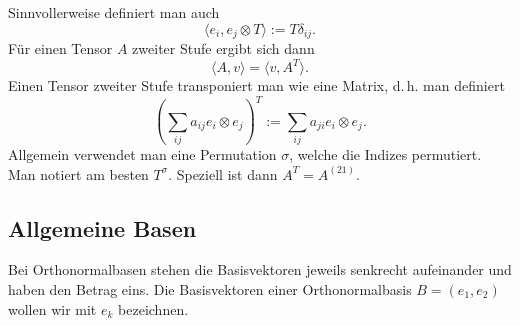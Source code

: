 \documentclass[a4paper,11pt,fleqn,twocolumn,twoside]{scrartcl}
\numberwithin{equation}{section}
\begin{document}
Sinnvollerweise definiert man auch%
\begin{equation}
\langle e_i,e_j\otimes T\rangle := T\delta_{ij}.
\end{equation}
Für einen Tensor $A$ zweiter Stufe ergibt sich dann%
\begin{equation}
\langle A,v\rangle = \langle v,A^T\rangle.
\end{equation}
Einen Tensor zweiter Stufe transponiert man wie eine Matrix,
d.\,h. man definiert%
\begin{equation}
(\sum_{ij}a_{ij}e_i\otimes e_j)^T:=\sum_{ij} a_{ji}e_i\otimes e_j.
\end{equation}
Allgemein verwendet man eine Permutation $\sigma$, welche die
Indizes permutiert. Man notiert am besten $T^\sigma$. Speziell
ist dann $A^T=A^{(21)}$.


\subsection{Allgemeine Basen}

Bei Orthonormalbasen stehen die Basisvektoren jeweils senkrecht
aufeinander und haben den Betrag eins. Die Basisvektoren einer
Orthonormalbasis $B=(e_1,e_2)$ wollen wir mit $e_k$ bezeichnen.
\end{document}
